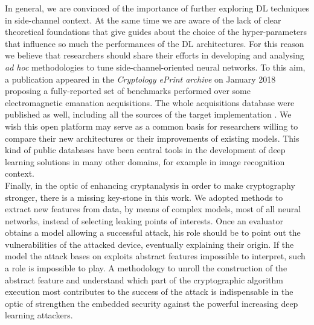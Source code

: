 In general, we are convinced of the importance of further exploring DL techniques in side-channel context. At the same time we are aware of the lack of clear theoretical foundations that give guides about the choice of the hyper-parameters that influence so much the performances of the DL architectures. For this reason we believe that researchers should share their efforts in developing and analysing \textit{ad hoc} methodologies to tune side-channel-oriented neural networks. To this aim, a publication appeared in the \emph{Cryptology ePrint archive} on January 2018 proposing a fully-reported set of benchmarks performed over some electromagnetic emanation acquisitions. The whole acquisitions database were published as well, including all the sources of the target implementation  \cite{eprintASCADpaper}. We wish this open platform may serve as a common basis for researchers willing to compare their new architectures or their improvements of existing models. This kind of public databases have been central tools in the development of deep learning solutions in many other domains, for example in image recognition context.\\

Finally, in the optic of enhancing cryptanalysis in order to make cryptography stronger, there is a missing key-stone in this work. We adopted methods to extract new features from data, by means of complex models, most of all neural networks, instead of selecting leaking points of interests. Once an evaluator obtains a model allowing a successful attack, his role should be to point out the vulnerabilities of the attacked device, eventually explaining their origin. If the model the attack bases on exploits abstract features impossible to interpret, such a role is impossible to play. A methodology to unroll the construction of the abstract feature and understand which part of the cryptographic algorithm execution most contributes to the success of the attack is indispensable in the optic of strengthen the embedded security against the powerful increasing deep learning attackers.
